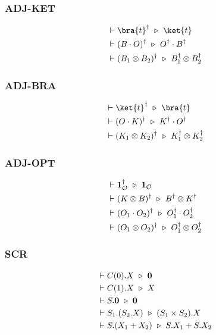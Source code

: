 \subsubsection*{\textsf{ADJ-KET}}
\begin{align*}
  & \vdash \bra{t}^\dagger \reduce \ket{t}\\
  & \vdash (B \cdot O)^\dagger \reduce O^\dagger \cdot B^\dagger \\
  & \vdash (B_1 \otimes B_2)^\dagger \reduce B_1^\dagger \otimes B_2^\dagger
\end{align*}

\subsubsection*{\textsf{ADJ-BRA}}
\begin{align*}
  & \vdash \ket{t}^\dagger \reduce \bra{t}\\
  & \vdash (O \cdot K)^\dagger \reduce K^\dagger \cdot O^\dagger \\
  & \vdash (K_1 \otimes K_2)^\dagger \reduce K_1^\dagger \otimes K_2^\dagger
\end{align*}

\subsubsection*{\textsf{ADJ-OPT}}
\begin{align*}
  & \vdash \mathbf{1}_\mathcal{O}^\dagger \ \triangleright\  \mathbf{1}_\mathcal{O}\\
  & \vdash (K \otimes B)^\dagger \ \triangleright\  B^\dagger \otimes K^\dagger \\
  & \vdash (O_1 \cdot O_2)^\dagger \ \triangleright\  O_1^\dagger \cdot O_2^\dagger \\
  & \vdash (O_1 \otimes O_2)^\dagger \ \triangleright\  O_1^\dagger \otimes O_2^\dagger
\end{align*}

\subsubsection*{\textsf{SCR}}
\begin{align*}
  & \vdash C(0).X \ \triangleright\  \mathbf{0}\\
  & \vdash C(1).X \ \triangleright\  X \\
  & \vdash S.\mathbf{0} \ \triangleright\  \mathbf{0} \\
  & \vdash S_1.(S_2.X) \ \triangleright\  (S_1 \times S_2).X \\
  & \vdash S.(X_1 + X_2) \ \triangleright\  S.X_1 + S.X_2
\end{align*}

